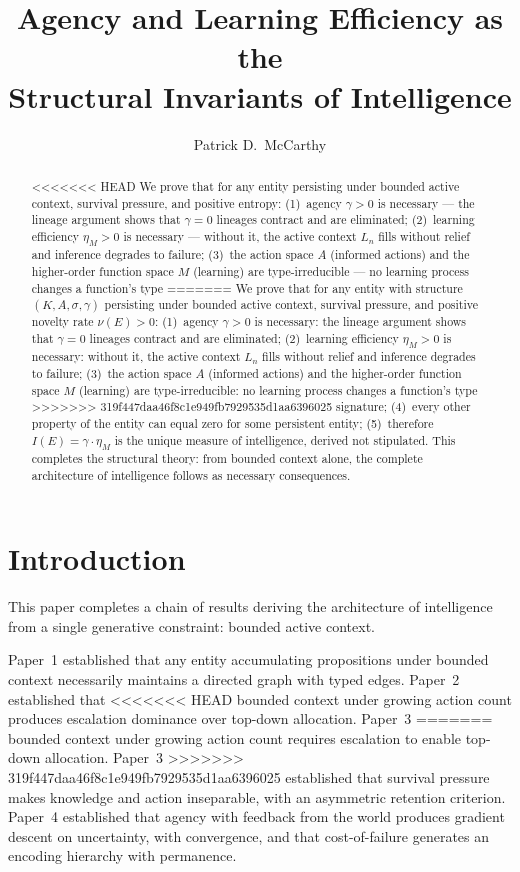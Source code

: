 \documentclass[11pt]{article}
\title{Agency and Learning Efficiency as the\\Structural Invariants of Intelligence}
\author{Patrick D.\ McCarthy}
\date{}
\theoremstyle{definition}
\theoremstyle{remark}
\begin{document}
\maketitle

\begin{abstract}
<<<<<<< HEAD
We prove that for any entity persisting under bounded active context,
survival pressure, and positive entropy: (1)~agency $\gamma > 0$ is
necessary --- the lineage argument shows that $\gamma = 0$ lineages contract
and are eliminated; (2)~learning efficiency $\eta_M > 0$ is necessary
--- without it, the active context $L_n$ fills without relief and
inference degrades to failure; (3)~the action space $A$ (informed
actions) and the higher-order function space $M$ (learning) are
type-irreducible --- no learning process changes a function's type
=======
We prove that for any entity with structure $(K, A, \sigma, \gamma)$
persisting under bounded active context, survival pressure, and
positive novelty rate $\nu(E) > 0$: (1)~agency $\gamma > 0$ is
necessary: the lineage argument shows that $\gamma = 0$ lineages contract
and are eliminated; (2)~learning efficiency $\eta_M > 0$ is necessary:
without it, the active context $L_n$ fills without relief and
inference degrades to failure; (3)~the action space $A$ (informed
actions) and the higher-order function space $M$ (learning) are
type-irreducible: no learning process changes a function's type
>>>>>>> 319f447daa46f8c1e949fb7929535d1aa6396025
signature; (4)~every other property of the entity can equal zero for
some persistent entity; (5)~therefore $I(E) = \gamma \cdot \eta_M$ is the
unique measure of intelligence, derived not stipulated. This completes
the structural theory: from bounded context alone, the complete
architecture of intelligence follows as necessary consequences.
\end{abstract}

\section{Introduction}
\label{sec:intro}

This paper completes a chain of results deriving the architecture of
intelligence from a single generative constraint: bounded active context.

Paper~1 \cite{McCarthy2026a} established that any entity accumulating
propositions under bounded context necessarily maintains a directed
graph with typed edges. Paper~2 \cite{McCarthy2026b} established that
<<<<<<< HEAD
bounded context under growing action count produces escalation
dominance over top-down allocation. Paper~3 \cite{McCarthy2026c}
=======
bounded context under growing action count requires escalation
to enable top-down allocation. Paper~3 \cite{McCarthy2026c}
>>>>>>> 319f447daa46f8c1e949fb7929535d1aa6396025
established that survival pressure makes knowledge and action
inseparable, with an asymmetric retention criterion.
Paper~4 \cite{McCarthy2026d}
established that agency with feedback from the world produces gradient
descent on uncertainty, with convergence, and that cost-of-failure
generates an encoding hierarchy with permanence.
\end{document}
